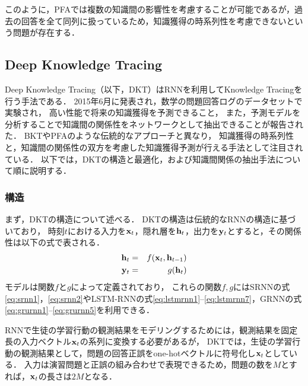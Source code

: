 このように，PFAでは複数の知識間の影響性を考慮することが可能であるが，過去の回答を全て同列に扱っているため，知識獲得の時系列性を考慮できないという問題が存在する．


\subsection{Deep Knowledge Tracing}
\label{sec:dkt}
Deep Knowledge Tracing\cite{piech2015deep}（以下，DKT）はRNNを利用してKnowledge Tracingを行う手法である．
2015年6月に発表され，数学の問題回答ログのデータセットで実験され，
高い性能で将来の知識獲得を予測できること，
また，予測モデルを分析することで知識間の関係性をネットワークとして抽出できることが報告された．
BKTやPFAのような伝統的なアプローチと異なり，
知識獲得の時系列性と，知識間の関係性の双方を考慮した知識獲得予測が行える手法として注目されている．
以下では，DKTの構造と最適化，および知識間関係の抽出手法について順に説明する．



\subsubsection{構造}
まず，DKTの構造について述べる．
DKTの構造は伝統的なRNNの構造に基づいており，
時刻$t$における入力を${\bf x}_t$，隠れ層を${\bf h}_t$，出力を${\bf y}_t$とすると，その関係性は以下の式で表される．
\begin{eqnarray}
\label{eq:rnn1}
{\bf h}_t &=& f({\bf x}_t, {\bf h}_{t-1})\\
\label{eq:rnn2}
{\bf y}_t &=& g({\bf h}_t)
\end{eqnarray}
モデルは関数$f$と$g$によって定義されており，
これらの関数$f, g$にはSRNNの式\ref{eq:srnn1}，\ref{eq:srnn2}やLSTM-RNNの式\ref{eq:lstmrnn1}--\ref{eq:lstmrnn7}，GRNNの式\ref{eq:grurnn1}--\ref{eq:grurnn5}を利用できる． 


RNNで生徒の学習行動の観測結果をモデリングするためには，観測結果を固定長の入力ベクトル${\bf x}_t$の系列に変換する必要があるが，
DKTでは，生徒の学習行動の観測結果として，問題の回答正誤をone-hotベクトルに符号化し${\bf x}_t$としている．
入力は演習問題と正誤の組み合わせで表現できるため，問題の数を$M$とすれば，${\bf x}_t$の長さは$2M$となる．


